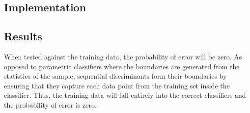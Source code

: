 \subsection{Implementation}

\subsection{Results}

When tested against the training data, the probability of error will be zero.
As opposed to parametric classifiers where the boundaries are generated from
the statistics of the sample, sequential discriminants form their boundaries by
ensuring that they capture each data point from the training set inside the
classifier. Thus, the training data will fall entirely into the correct
classifiers and the probability of error is zero.


